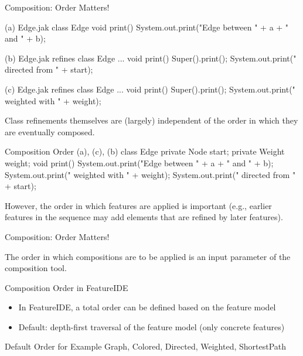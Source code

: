 \begin{frame}[fragile]{Composition: Order Matters!}
	\small
	\begin{mycolumns}[animation=none]
\begin{codetight}[style=footnotesize]{(a) Edge.jak}
class Edge {
	void print() {
		System.out.print("Edge between " + a + " and " + b);
	}
}
\end{codetight}
\begin{codetight}[style=footnotesize]{(b) Edge.jak}
refines class Edge { ...
	void print() {
		Super().print();
		System.out.print(" directed from " + start);
	}
}
\end{codetight}
\begin{codetight}[style=footnotesize]{(c) Edge.jak}
refines class Edge { ...
	void print() {
		Super().print();
		System.out.print(" weighted with " + weight);
	}
}
\end{codetight}
	\mynextcolumn
		\begin{note}{}
			Class refinements themselves are (largely) independent of the order in which they are eventually composed.
		\end{note}
\begin{codetight}[style=footnotesize]{Composition Order (a), (c), (b)}
class Edge {
	private Node start;
	private Weight weight;
	void print() {
		System.out.print("Edge between " + a + " and " + b);
		System.out.print(" weighted with " + weight);
		System.out.print(" directed from " + start);
	}
}
\end{codetight}
		\begin{note}{}
			However, the order in which features are applied is important 
			(e.g., earlier features in the sequence may add elements that are refined by later features). 
		\end{note}
	\end{mycolumns}
\end{frame}

\begin{frame}{Composition: Order Matters!}
	\begin{mycolumns}[b]
		\begin{note}{}
			The order in which compositions are to be applied is an input parameter of the composition tool.
		\end{note}
		\begin{note}{Composition Order in FeatureIDE}
			\begin{itemize}
				\item In FeatureIDE, a total order can be defined based on the feature model
				\item Default: depth-first traversal of the feature model (only concrete features)
			\end{itemize}
		\end{note}
	\mynextcolumn
		\centering\featureDiagramGraphs
		\begin{example}{Default Order for Example}
			Graph, Colored, Directed, Weighted, ShortestPath
		\end{example}
	\end{mycolumns}
\end{frame}

